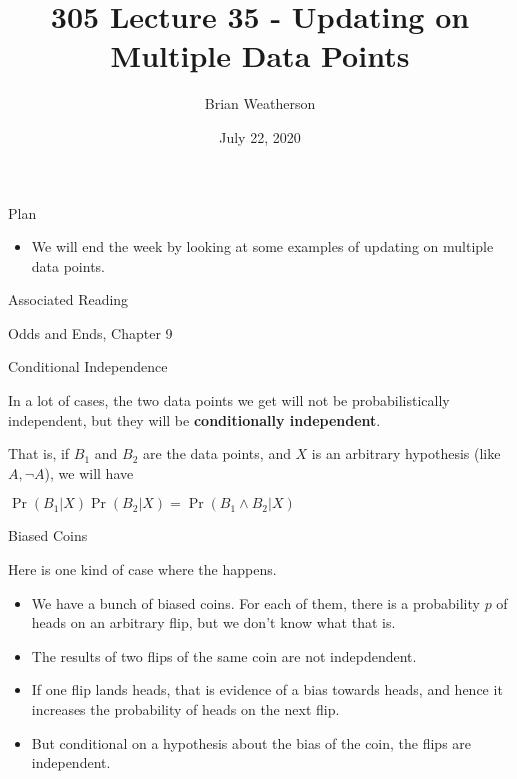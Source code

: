 \documentclass[
  ignorenonframetext,
]{beamer}
\title{305 Lecture 35 - Updating on Multiple Data Points}
\author{Brian Weatherson}
\date{July 22, 2020}
\providecommand{\tightlist}{%
  \setlength{\itemsep}{0pt}\setlength{\parskip}{0pt}}
\renewcommand{\,}{\text{, }}
\renewenvironment*{quote}	
	{\list{}{\rightmargin   \leftmargin} \item } 	
	{\endlist }
\begin{document}
\frame{\titlepage}

\begin{frame}{Plan}
\protect\hypertarget{plan}{}

\begin{itemize}
\tightlist
\item
  We will end the week by looking at some examples of updating on
  multiple data points.
\end{itemize}

\end{frame}

\begin{frame}{Associated Reading}
\protect\hypertarget{associated-reading}{}

Odds and Ends, Chapter 9

\end{frame}

\begin{frame}{Conditional Independence}
\protect\hypertarget{conditional-independence}{}

In a lot of cases, the two data points we get will not be
probabilistically independent, but they will be \textbf{conditionally
independent}.

That is, if \(B_1\) and \(B_2\) are the data points, and \(X\) is an
arbitrary hypothesis (like \(A, \neg A\)), we will have

\begin{quote}
\(\Pr(B_1 | X)\Pr(B_2 | X) = \Pr(B_1 \wedge B_2 | X)\)
\end{quote}

\end{frame}

\begin{frame}{Biased Coins}
\protect\hypertarget{biased-coins}{}

Here is one kind of case where the happens.

\begin{itemize}
\tightlist
\item
  We have a bunch of biased coins. For each of them, there is a
  probability \(p\) of heads on an arbitrary flip, but we don't know
  what that is. \pause
\item
  The results of two flips of the same coin are not indepdendent.
\item
  If one flip lands heads, that is evidence of a bias towards heads, and
  hence it increases the probability of heads on the next flip. \pause
\item
  But conditional on a hypothesis about the bias of the coin, the flips
  are independent.
\end{itemize}

\end{frame}
\end{document}
